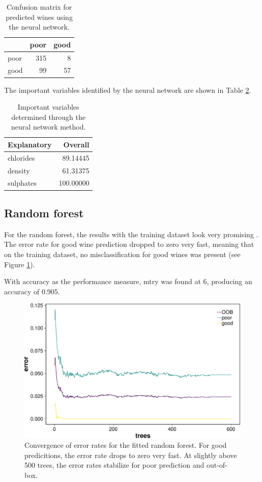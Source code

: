\documentclass[11pt,]{article}
\begin{document}
\begin{table}[!h]

\caption{\label{tab:nnet-results}Confusion matrix for predicted wines using the neural network.}
\centering
\begin{tabular}[t]{lrr}
\toprule
  & poor & good\\
\midrule
poor & 315 & 8\\
good & 99 & 57\\
\bottomrule
\end{tabular}
\end{table}

The important variables identified by the neural network are shown in
Table \ref{tab:nnetimp}.

\begin{table}[!h]

\caption{\label{tab:nnetimp}Important variables determined through the neural network method.}
\centering
\begin{tabular}{lr}
\toprule
Explanatory & Overall\\
\midrule
chlorides & 89.14445\\
density & 61.31375\\
sulphates & 100.00000\\
\bottomrule
\end{tabular}
\end{table}

\hypertarget{random-forest-1}{%
\subsection{Random forest}\label{random-forest-1}}

For the random forest, the results with the training dataset look very
promising . The error rate for good wine prediction dropped to zero very
fast, meaning that on the training dataset, no misclassification for
good wines was present (see Figure \ref{fig:randforresults}).

With accuracy as the performance measure, mtry was found at 6, producing
an accuracy of 0.905.

\begin{figure}

{\centering \includegraphics[width=0.75\linewidth]{./figures/randforresults-1} 

}

\caption{Convergence of error rates for the fitted random forest. For good predicitions, the error rate drops to zero very fast. At slightly above 500 trees, the error rates stabilize for poor prediction and out-of-box.}\label{fig:randforresults}
\end{figure}
\end{document}
